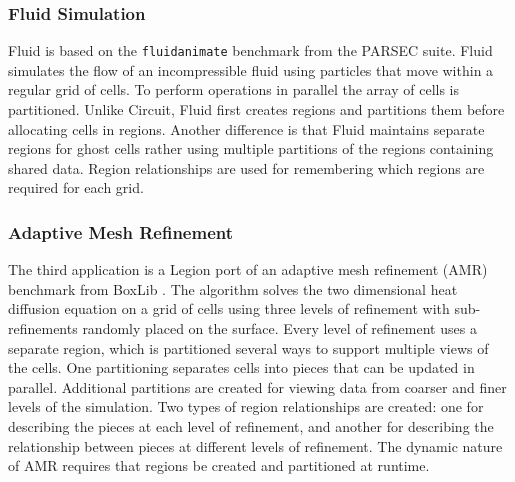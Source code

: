 \subsubsection{Fluid Simulation}
\label{subsec:fluid}
Fluid is based on the {\tt fluidanimate} benchmark from the PARSEC 
suite\cite{bienia11benchmarking}.  Fluid simulates the flow of an incompressible fluid
using particles that move within a regular grid of cells.  To perform operations in 
parallel the array of cells is partitioned.  Unlike
Circuit, Fluid first creates regions and partitions them before
allocating cells in regions.  Another difference is that Fluid
maintains separate regions for ghost cells rather using multiple partitions of
the regions containing shared data.  Region relationships are used for remembering
which regions are required for each grid.

\subsubsection{Adaptive Mesh Refinement}
\label{subsec:amr}
The third application is a Legion port of an adaptive mesh refinement (AMR) benchmark 
from BoxLib \cite{BoxLib}.  The algorithm solves the two
dimensional heat diffusion equation on a grid of cells using three levels of refinement with sub-refinements
randomly placed on the surface.  
Every level of refinement uses a separate region, which is partitioned several ways to support multiple views of
the cells.  One partitioning separates cells into pieces that can be updated in
parallel.  Additional partitions are created for viewing data from coarser and finer levels of
the simulation.  Two types of region relationships are created: one for describing the pieces at 
each level of refinement, and another for describing the relationship between pieces at different
levels of refinement.  
The dynamic nature of AMR requires that regions be created and partitioned at runtime.  


